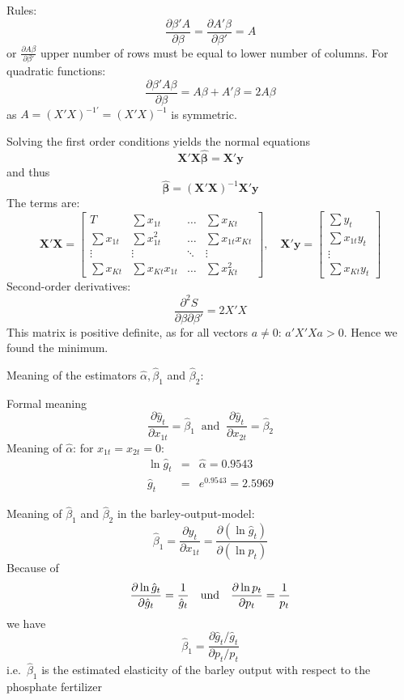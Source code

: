 \documentclass{article}
\begin{document}
Rules:
$$\frac{\partial \beta'A}{\partial\beta} = \frac{\partial A'\beta}{\partial\beta'}=A$$
or $\frac{\partial A\beta}{\partial\beta'}$ upper number of rows must be equal to lower number of columns. For quadratic functions:
$$\frac{\partial \beta'A\beta}{\partial\beta} = A\beta + A' \beta = 2A\beta$$
as $A=(X'X)^{-1'}=(X'X)^{-1}$ is symmetric.

Solving the first order conditions yields the normal equations
\[ \mathbf{\mathbf{X}'\mathbf{X}\hat{\beta}=X}'\mathbf{y} \]
and thus
\[ \mathbf{\hat{\beta}}=\left( \mathbf{X}'\mathbf{X}\right) ^{-1}
\mathbf{X}'\mathbf{y} \]
The terms are:
\[ \mathbf{X}'\mathbf{X}\mathbf{=}\left[ 
\begin{array}{llll}
T & \sum x_{1t} & \ldots & \sum x_{Kt} \\ 
\sum x_{1t} & \sum x_{1t}^{2} & \ldots & \sum x_{1t}x_{Kt} \\ 
\vdots & \vdots & \ddots & \vdots \\ 
\sum x_{Kt} & \sum x_{Kt}x_{1t} & \ldots & \sum x_{Kt}^{2}%
\end{array}%
\right] ,\quad \mathbf{X}'\mathbf{y}\mathbf{=}\left[ 
\begin{array}{l}
\sum y_{t} \\ 
\sum x_{1t}y_{t} \\ 
\vdots \\ 
\sum x_{Kt}y_{t}%
\end{array}%
\right] \]
Second-order derivatives:
$$\frac{\partial^2 S}{\partial \beta \partial \beta'} = 2X'X$$ This matrix is positive definite, as for all vectors $a\neq0$: $a'X'Xa >0$. Hence we found the minimum.

Meaning of the estimators $\hat{\alpha},\hat{\beta}_{1}$ and $\hat{\beta}_{2}$:

Formal meaning
\[ \frac{\partial \hat{y}_{t}}{\partial x_{1t}}=\hat{\beta}_{1}\;\;\text{and}\;\;\frac{\partial \hat{y}_{t}}{\partial x_{2t}}=\hat{\beta}_{2} \]
Meaning of $\hat{\alpha}$: for $x_{1t}=x_{2t}=0$:
\begin{eqnarray*}
\ln \hat{g}_{t} &=&\hat{\alpha}=0.9543 \\
\hat{g}_{t} &=&e^{0.9543}=2.5969
\end{eqnarray*}

Meaning of $\hat{\beta}_{1}$ and $\hat{\beta}_{2}$ in the barley-output-model:
\[ \hat{\beta}_{1}=\frac{\partial \hat{y}_{t}}{\partial x_{1t}}=\frac{\partial
\left( \ln \hat{g}_{t}\right) }{\partial \left( \ln p_{t}\right) } \]
Because of
\[ \frac{\partial \ln \hat{g}_{t}}{\partial \hat{g}_{t}}=\frac{1}{\hat{g}_{t}}\quad 
\text{und\quad }\frac{\partial \ln p_{t}}{\partial p_{t}}=\frac{1}{p_{t}} \]
we have
\[ \hat{\beta}_{1}=\frac{\partial \hat{g}_{t}/\hat{g}_{t}}{\partial p_{t}/p_{t}} \]
i.e.\ $\hat{\beta}_{1}$ is the estimated elasticity of the barley output
with respect to the phosphate fertilizer
\end{document}
